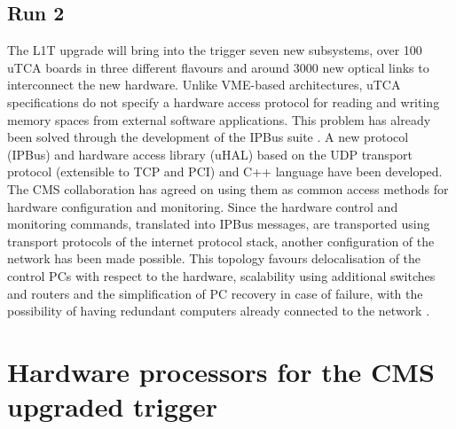 \documentclass[a4paper]{jpconf}
\begin{document}
\subsection{Run 2}
The L1T upgrade will bring into the trigger seven new subsystems, over 100 uTCA boards in three different flavours and around 3000 new optical links to interconnect the new hardware. Unlike VME-based architectures, uTCA specifications do not specify a hardware access protocol for reading and writing memory spaces from external software applications. This problem has already been solved  through the development of the IPBus suite \cite{ipbus_suite}. A new protocol (IPBus) and hardware access library (uHAL) based on the UDP transport protocol (extensible to TCP and PCI) and C++ language have been developed. The CMS collaboration has agreed on using them as common access methods for hardware configuration and monitoring. Since the hardware control and monitoring commands, translated into IPBus messages, are transported using transport protocols of the internet protocol stack, another configuration of the network has been made possible. This topology favours delocalisation of the control PCs with respect to the hardware, scalability using additional switches and routers and the simplification of PC recovery in case of failure, with the possibility of having redundant computers already connected to the network \cite{tom_paper}.

\section{Hardware processors for the CMS upgraded trigger}
\end{document}
